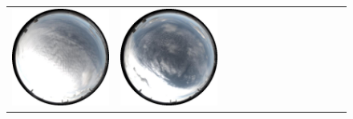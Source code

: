 \begin{figure}[!ht]
\begin{tabular}{@{}rcccccccccccc@{}}
    \includegraphics[width=\customwidth]{./figures/reconstruction/envmaps/20141011_102928.jpg} &
    \includegraphics[width=\customwidth]{./figures/reconstruction/envmaps/20141011_110128.jpg} &

\end{tabular}
\end{figure}
